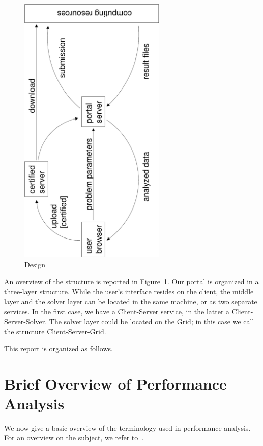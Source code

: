 \documentclass[11pt,relax]{SANDreport}
\begin{document}
\smallskip

\begin{figure}
\includegraphics[width=7cm,angle=-90]{portal_design}
\caption{Design}
\label{fig:design}
\end{figure}

An overview of the structure is reported in Figure~\ref{fig:design}.
Our portal is organized in a three-layer structure. While the user's interface
resides on the client, the middle layer and the solver layer can be located in
the same machine, or as two separate services. In the first case, we have a
Client-Server service, in the latter a Client-Server-Solver. The solver layer
could be located on the Grid; in this case we call the structure
Client-Server-Grid.

\medskip

This report is organized as follows.

\section{Brief Overview of Performance Analysis}

We now give a basic overview of the terminology used in performance analysis.
For an overview on the subject, we refer to~\cite{jain91art}.
\end{document}
